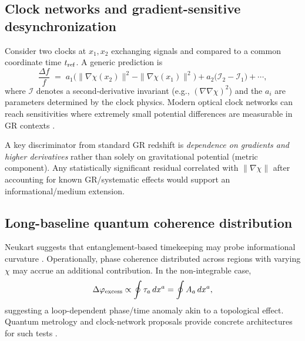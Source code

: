 \documentclass[11pt]{article}
\newcommand{\tua}{\tau_a}
\begin{document}
    \subsection{Clock networks and gradient-sensitive desynchronization}
        Consider two clocks at $x_1,x_2$ exchanging signals and compared to a common coordinate time $t_{\rm ref}$. A generic prediction is
        \begin{equation}
            \frac{\Delta f}{f}
            \;=\;
            a_1\Big(\|\nabla\chi(x_2)\|^2-\|\nabla\chi(x_1)\|^2\Big)
            + a_2\Big(\mathcal{I}_2-\mathcal{I}_1\Big)
            + \cdots,
            \label{eq:freqshift}
        \end{equation}
        where $\mathcal{I}$ denotes a second-derivative invariant (e.g., $(\nabla\nabla\chi)^2$) and the $a_i$ are parameters determined by the clock physics. Modern optical clock networks can reach sensitivities where extremely small potential differences are measurable in GR contexts \cite{Ludlow2015_OpticalClocks}.

        A key discriminator from standard GR redshift is \emph{dependence on gradients and higher derivatives} rather than solely on gravitational potential (metric component). Any statistically significant residual correlated with $\|\nabla\chi\|$ after accounting for known GR/systematic effects would support an informational/medium extension.

    \subsection{Long-baseline quantum coherence distribution}
        Neukart suggests that entanglement-based timekeeping may probe informational curvature \cite{Neukart2026_InfoTime}. Operationally, phase coherence distributed across regions with varying $\chi$ may accrue an additional contribution. In the non-integrable case,
        \begin{equation}
            \Delta\varphi_{\rm excess} \propto \oint \tua\,dx^a = \oint A_a\,dx^a,
            \label{eq:phase_holonomy}
        \end{equation}
        suggesting a loop-dependent phase/time anomaly akin to a topological effect. Quantum metrology and clock-network proposals provide concrete architectures for such tests \cite{Giovannetti2011_Metrology,Komar2014_ClockNetwork}.
\end{document}
